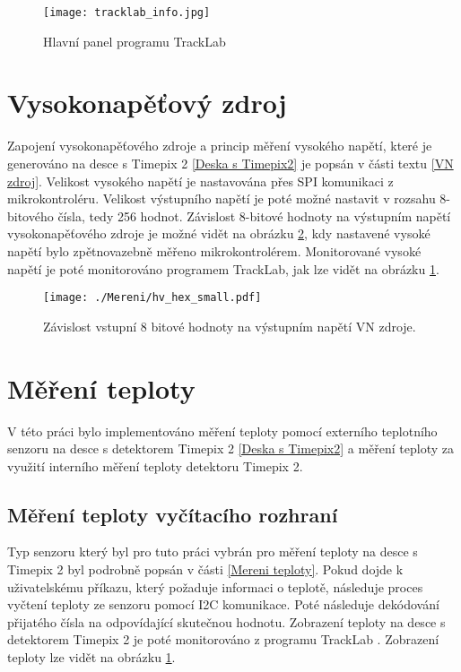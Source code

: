 \begin{figure}[h!]
	\centering
	\captionsetup{justification=centering}
	\texttt{[image: tracklab\_info.jpg]}
	\caption{Hlavní panel programu TrackLab \cite{Manek_2024}} 
	\label{fig:Tracklab}
\end{figure}



\section{Vysokonapěťový zdroj}
Zapojení vysokonapěťového zdroje a princip měření vysokého napětí, které je generováno na desce s Timepix 2 \ref{Deska s Timepix2} je popsán v části textu \ref{VN zdroj}. Velikost vysokého napětí je nastavována přes SPI komunikaci z mikrokontroléru. Velikost výstupního napětí je poté možné nastavit v rozsahu 8-bitového čísla, tedy 256 hodnot. Závislost 8-bitové hodnoty na výstupním napětí vysokonapěťového zdroje je možné vidět na obrázku \ref{fig:hv_hex}, kdy nastavené vysoké napětí bylo zpětnovazebně měřeno mikrokontrolérem. Monitorované vysoké napětí je poté monitorováno programem TrackLab, jak lze vidět na obrázku \ref{fig:Tracklab}.
\begin{figure}[h!]
	\centering
	\captionsetup{justification=centering}
	\texttt{[image: ./Mereni/hv\_hex\_small.pdf]}
	\caption{Závislost vstupní 8 bitové hodnoty na výstupním napětí VN zdroje.} 
	\label{fig:hv_hex}
\end{figure}

\section{Měření teploty}
V této práci bylo implementováno měření teploty pomocí externího teplotního senzoru na desce s detektorem Timepix 2 \ref{Deska s Timepix2} a měření teploty za využití interního měření teploty detektoru Timepix 2.
\subsection{Měření teploty vyčítacího rozhraní}
Typ senzoru který byl pro tuto práci vybrán pro měření teploty na desce s Timepix 2 byl podrobně popsán v části \ref{Mereni teploty}. Pokud dojde k uživatelskému příkazu, který požaduje informaci o teplotě, následuje proces vyčtení teploty ze senzoru pomocí I2C komunikace. Poté následuje dekódování přijatého čísla na odpovídající skutečnou hodnotu. Zobrazení teploty na desce s detektorem Timepix 2 je poté monitorováno z programu TrackLab \cite{Manek_2024}. Zobrazení teploty lze vidět na obrázku \ref{fig:Tracklab}.

